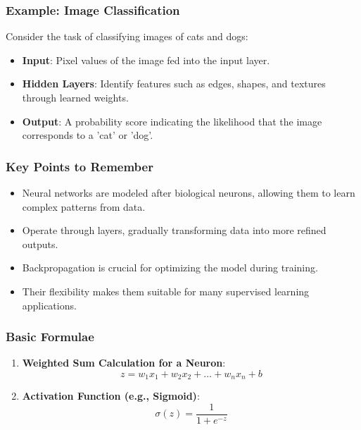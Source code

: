 \documentclass[aspectratio=169]{beamer}
\begin{document}
\begin{frame}[fragile]
    \frametitle{Example: Image Classification}
    Consider the task of classifying images of cats and dogs:
    \begin{itemize}
        \item \textbf{Input}: Pixel values of the image fed into the input layer.
        \item \textbf{Hidden Layers}: Identify features such as edges, shapes, and textures through learned weights.
        \item \textbf{Output}: A probability score indicating the likelihood that the image corresponds to a 'cat' or 'dog'.
    \end{itemize}
\end{frame}

\begin{frame}[fragile]
    \frametitle{Key Points to Remember}
    \begin{itemize}
        \item Neural networks are modeled after biological neurons, allowing them to learn complex patterns from data.
        \item Operate through layers, gradually transforming data into more refined outputs.
        \item Backpropagation is crucial for optimizing the model during training.
        \item Their flexibility makes them suitable for many supervised learning applications.
    \end{itemize}
\end{frame}

\begin{frame}[fragile]
    \frametitle{Basic Formulae}
    \begin{enumerate}
        \item \textbf{Weighted Sum Calculation for a Neuron}:
        \begin{equation}
            z = w_1 x_1 + w_2 x_2 + \ldots + w_n x_n + b
        \end{equation}
        
        \item \textbf{Activation Function (e.g., Sigmoid)}:
        \begin{equation}
            \sigma(z) = \frac{1}{1 + e^{-z}}
        \end{equation}
    \end{enumerate}
\end{frame}
\end{document}
